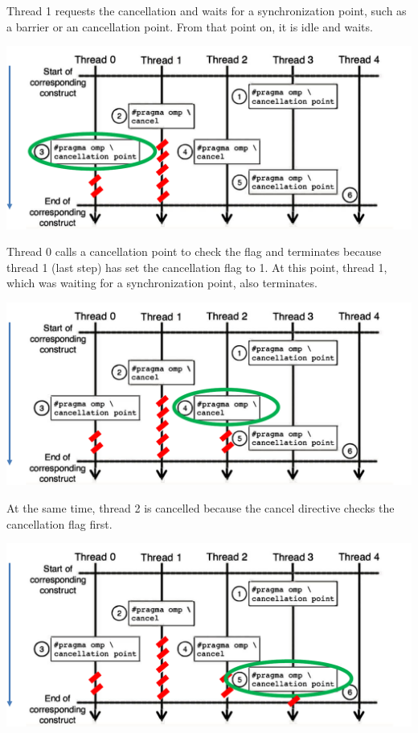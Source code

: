 \begin{examplebox}
    Thread 1 requests the cancellation and waits for a synchronization point, such as a barrier or an cancellation point. From that point on, it is idle and waits.
    \begin{center}
        \includegraphics[width=\textwidth]{img/openmp-cancel-3.pdf}
    \end{center}

    Thread 0 calls a cancellation point to check the flag and terminates because thread 1 (last step) has set the cancellation flag to 1. At this point, thread 1, which was waiting for a synchronization point, also terminates.
    \begin{center}
        \includegraphics[width=\textwidth]{img/openmp-cancel-4.pdf}
    \end{center}
    
    At the same time, thread 2 is cancelled because the cancel directive checks the cancellation flag first.
    \begin{center}
        \includegraphics[width=\textwidth]{img/openmp-cancel-5.pdf}
    \end{center}


\end{examplebox}
